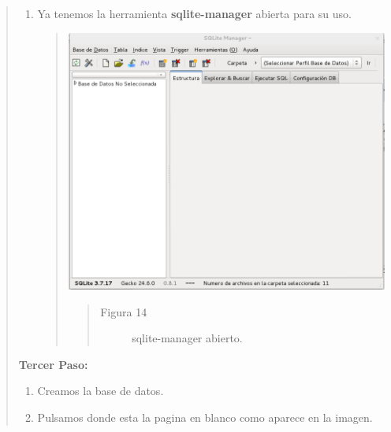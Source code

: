 \documentclass[letterpaper,11pt,spanish]{sphinxmanual}
\begin{document}
\begin{quote}
\begin{enumerate}
\begin{quote}
\begin{quote}
\begin{description}
\end{description}\end{quote}
\end{quote}

\item {} 
Ya tenemos la herramienta \textbf{sqlite-manager} abierta para su uso.
\begin{quote}

\includegraphics{buscar2.png}
\begin{quote}\begin{description}
\item[{Figura 14}] \leavevmode
sqlite-manager abierto.

\end{description}\end{quote}
\end{quote}

\end{enumerate}

\textbf{Tercer Paso:}
\begin{enumerate}
\item {} 
Creamos la base de datos.

\item {} 
Pulsamos donde esta la pagina en blanco como aparece en la imagen.
\begin{quote}


\end{quote}
\end{enumerate}
\end{quote}
\end{document}
